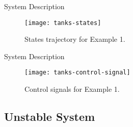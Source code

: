 \begin{slide}{System Description}
  \begin{figure}[ht!]
    \centering
    \captionsetup{justification=centering}
    \texttt{[image: tanks-states]}
    \caption{States trajectory for Example 1.}%
    \label{fig:level-system-control-states}
  \end{figure}
  \vspace*{\fill}
\end{slide}

\begin{slide}{System Description}
  \vspace*{\fill}
  \begin{figure}[ht!]
    \centering
    \captionsetup{justification=centering}
    \texttt{[image: tanks-control-signal]}
    \caption{Control signals for Example 1.}%
    \label{fig:level-system-control-signals}
  \end{figure}
\end{slide}

\subsection{Unstable System}%
\label{subsec:unstable-system}

